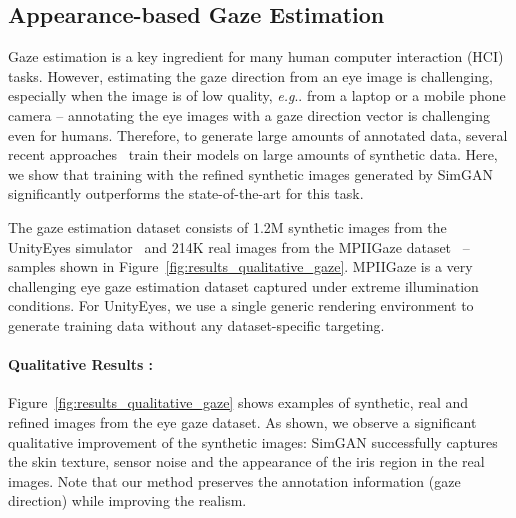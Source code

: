 \documentclass[10pt,twocolumn,letterpaper]{article}
\makeatletter
\DeclareRobustCommand\onedot{\futurelet\@let@token\@onedot}
\def\@onedot{\ifx\@let@token.\else.\null\fi\xspace}
\def\eg{\emph{e.g}\onedot} \def\Eg{\emph{E.g}\onedot}
\makeatother
\begin{document}
\subsection{Appearance-based Gaze Estimation}

Gaze estimation is a key ingredient for many human computer interaction (HCI) tasks. 
However, estimating the gaze direction from an eye image is challenging, especially when the image is of low quality, \eg from a laptop or a mobile phone camera -- annotating the eye images with a gaze direction vector is challenging even for humans.
Therefore, to generate large amounts of annotated data, several recent approaches~\cite{Wood16,Zhang15a} train their models on large amounts of synthetic data. 
Here, we show that training with the refined synthetic images generated by SimGAN significantly outperforms the state-of-the-art for this task.

The gaze estimation dataset consists of 1.2M synthetic images from the UnityEyes simulator~\cite{Wood16}  and 214K real images from the MPIIGaze dataset~\cite{Zhang15a} -- samples shown in Figure~\ref{fig:results_qualitative_gaze}.
MPIIGaze is a very challenging eye gaze estimation dataset captured under extreme illumination conditions.
For UnityEyes, we use a single generic rendering environment to generate training data without any dataset-specific targeting.


\vspace{-0.15in}
\paragraph{Qualitative Results :}
Figure~\ref{fig:results_qualitative_gaze} shows examples of synthetic, real and refined images from the eye gaze dataset.
As shown, we observe a significant qualitative improvement of the synthetic images: SimGAN successfully captures the skin texture, sensor noise and the appearance of the iris region in the real images. Note that our method preserves the annotation information (gaze direction) while improving the realism.
\end{document}
